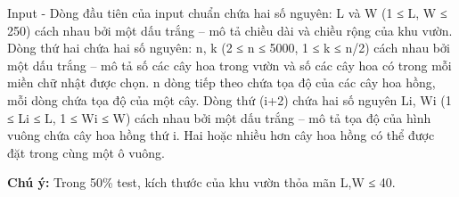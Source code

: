 Input
- Dòng đầu tiên của input chuẩn chứa hai số nguyên: L và W (1 ≤ L, W ≤ 250) cách nhau bởi một dấu trắng – mô tả chiều dài và chiều rộng của khu vườn. Dòng thứ hai chứa hai số nguyên: n, k (2 ≤ n ≤ 5000, 1 ≤ k ≤ n/2) cách nhau bởi một dấu trắng – mô tả số các cây hoa trong vườn và số các cây hoa có trong mỗi miền chữ nhật được chọn. n dòng tiếp theo chứa tọa độ của các cây hoa hồng, mỗi dòng chứa tọa độ của một cây. Dòng thứ (i+2) chứa hai số nguyên Li, Wi (1 ≤ Li ≤ L, 1 ≤ Wi ≤ W) cách nhau bởi một dấu trắng – mô tả tọa độ của hình vuông chứa cây hoa hồng thứ i. Hai hoặc nhiều hơn cây hoa hồng có thể được đặt trong cùng một ô vuông.

\textbf{Chú ý: } Trong 50\% test, kích thước của khu vườn thỏa mãn L,W ≤ 40.